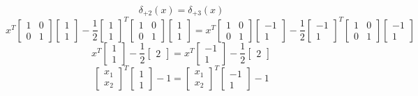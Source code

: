 \documentclass[12pt]{article}
\begin{document}
\[
    \delta_{+2}(x) = \delta_{+3}(x)
\]
\[
    x^T\begin{bmatrix} 1 & 0\\ 0 & 1\end{bmatrix}\begin{bmatrix} 1 \\ 1\end{bmatrix} - \frac{1}{2}\begin{bmatrix} 1 \\ 1\end{bmatrix}^T\begin{bmatrix} 1 & 0\\ 0 & 1\end{bmatrix}\begin{bmatrix} 1 \\ 1\end{bmatrix}
    =
    x^T\begin{bmatrix} 1 & 0\\ 0 & 1\end{bmatrix}\begin{bmatrix} -1 \\ 1\end{bmatrix} - \frac{1}{2}\begin{bmatrix} -1 \\ 1\end{bmatrix}^T\begin{bmatrix} 1 & 0\\ 0 & 1\end{bmatrix}\begin{bmatrix} -1 \\ 1\end{bmatrix}
\]
\[
    x^T\begin{bmatrix} 1 \\ 1\end{bmatrix}-\frac{1}{2}\begin{bmatrix}2\end{bmatrix}
    =
    x^T\begin{bmatrix} -1 \\ 1\end{bmatrix}-\frac{1}{2}\begin{bmatrix}2\end{bmatrix}
\]
\[
    \begin{bmatrix} x_1 \\ x_2\end{bmatrix}^T\begin{bmatrix} 1 \\ 1\end{bmatrix}-1
    =
    \begin{bmatrix} x_1 \\ x_2\end{bmatrix}^T\begin{bmatrix} -1 \\ 1\end{bmatrix} -1
\]
\end{document}
